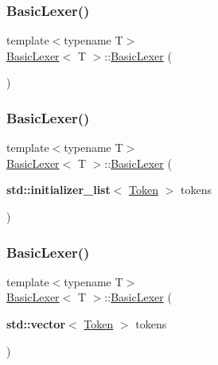\subsubsection{\texorpdfstring{Basic\+Lexer()}{BasicLexer()}\hspace{0.1cm}{\footnotesize\ttfamily [1/6]}}
{\footnotesize\ttfamily template$<$typename T$>$ \\
\hyperlink{class_basic_lexer}{Basic\+Lexer}$<$ T $>$\+::\hyperlink{class_basic_lexer}{Basic\+Lexer} (\begin{DoxyParamCaption}{ }\end{DoxyParamCaption})\hspace{0.3cm}{\ttfamily [inline]}}

\mbox{\label{class_basic_lexer_a58d2038fb47025d4e32c20750e713b43}} 
\subsubsection{\texorpdfstring{Basic\+Lexer()}{BasicLexer()}\hspace{0.1cm}{\footnotesize\ttfamily [2/6]}}
{\footnotesize\ttfamily template$<$typename T$>$ \\
\hyperlink{class_basic_lexer}{Basic\+Lexer}$<$ T $>$\+::\hyperlink{class_basic_lexer}{Basic\+Lexer} (\begin{DoxyParamCaption}\item[{\textbf{ std\+::initializer\+\_\+list}$<$ \hyperlink{class_token}{Token} $>$}]{tokens }\end{DoxyParamCaption})\hspace{0.3cm}{\ttfamily [inline]}}

\mbox{\label{class_basic_lexer_a1fd5d2795464497ffbe2bf61c892d619}} 
\subsubsection{\texorpdfstring{Basic\+Lexer()}{BasicLexer()}\hspace{0.1cm}{\footnotesize\ttfamily [3/6]}}
{\footnotesize\ttfamily template$<$typename T$>$ \\
\hyperlink{class_basic_lexer}{Basic\+Lexer}$<$ T $>$\+::\hyperlink{class_basic_lexer}{Basic\+Lexer} (\begin{DoxyParamCaption}\item[{\textbf{ std\+::vector}$<$ \hyperlink{class_token}{Token} $>$}]{tokens }\end{DoxyParamCaption})\hspace{0.3cm}{\ttfamily [inline]}}

